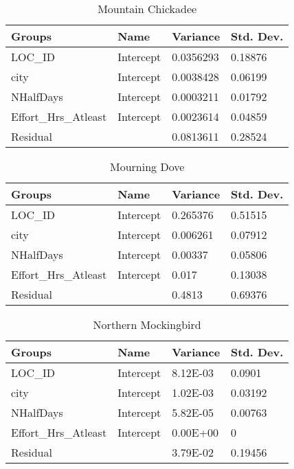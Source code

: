 \begin{longtable}[c]{|l|l|l|l|}
\caption{Mountain Chickadee}
\label{my-label}\\
\hline
Groups               & Name      & Variance  & Std. Dev. \\ \hline
\endhead
%
LOC\_ID              & Intercept & 0.0356293 & 0.18876   \\ \hline
city                 & Intercept & 0.0038428 & 0.06199   \\ \hline
NHalfDays            & Intercept & 0.0003211 & 0.01792   \\ \hline
Effort\_Hrs\_Atleast & Intercept & 0.0023614 & 0.04859   \\ \hline
Residual             &           & 0.0813611 & 0.28524   \\ \hline
\end{longtable}


\begin{longtable}[c]{|l|l|l|l|}
\caption{Mourning Dove}
\label{my-label}\\
\hline
Groups               & Name      & Variance & Std. Dev. \\ \hline
\endhead
%
LOC\_ID              & Intercept & 0.265376 & 0.51515   \\ \hline
city                 & Intercept & 0.006261 & 0.07912   \\ \hline
NHalfDays            & Intercept & 0.00337  & 0.05806   \\ \hline
Effort\_Hrs\_Atleast & Intercept & 0.017    & 0.13038   \\ \hline
Residual             &           & 0.4813   & 0.69376   \\ \hline
\end{longtable}

\begin{longtable}[c]{|l|l|l|l|}
\caption{Northern Mockingbird}
\label{my-label}\\
\hline
Groups               & Name      & Variance & Std. Dev. \\ \hline
\endhead
%
LOC\_ID              & Intercept & 8.12E-03 & 0.0901    \\ \hline
city                 & Intercept & 1.02E-03 & 0.03192   \\ \hline
NHalfDays            & Intercept & 5.82E-05 & 0.00763   \\ \hline
Effort\_Hrs\_Atleast & Intercept & 0.00E+00 & 0         \\ \hline
Residual             &           & 3.79E-02 & 0.19456   \\ \hline
\end{longtable}


